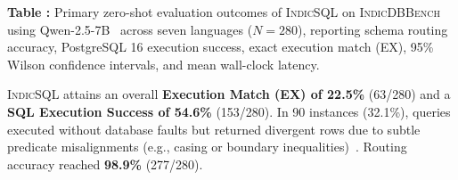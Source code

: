 \documentclass[conference]{IEEEtran}
\begin{document}
\begin{table}[htbp]
\centering
\renewcommand{\arraystretch}{1.25}
\vspace{6pt}
\label{tab:main_results}
\begin{flushleft}
\small\textbf{Table \thetable:} Primary zero-shot evaluation outcomes of \textsc{IndicSQL} on \textsc{IndicDBBench}~\cite{dawar2026indicdbbench} using Qwen-2.5-7B~\cite{qwen2024qwen2.5} across seven languages ($N=280$), reporting schema routing accuracy, PostgreSQL 16 execution success, exact execution match (EX), 95\% Wilson confidence intervals, and mean wall-clock latency.
\end{flushleft}
\end{table}

\textsc{IndicSQL} attains an overall \textbf{Execution Match (EX) of 22.5\%} (63/280) and a \textbf{SQL Execution Success of 54.6\%} (153/280). In 90 instances (32.1\%), queries executed without database faults but returned divergent rows due to subtle predicate misalignments (e.g., casing or boundary inequalities)~\cite{wang2024macsql, pourreza2023dinsql}. Routing accuracy reached \textbf{98.9\%} (277/280).
\end{document}
